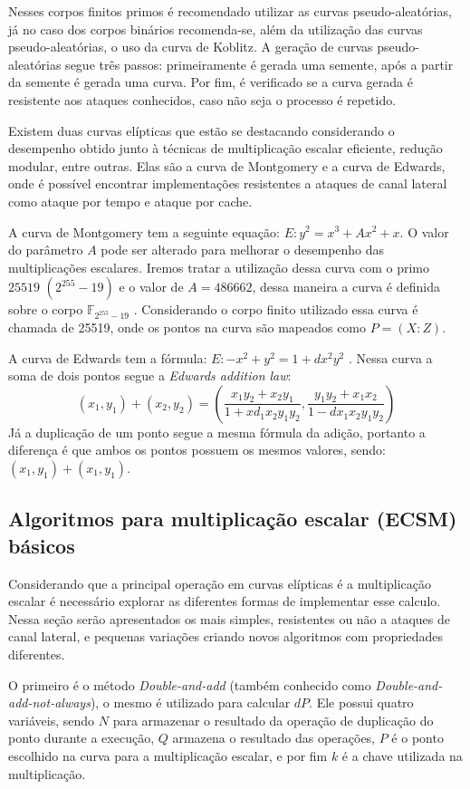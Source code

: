 Nesses corpos finitos primos é recomendado utilizar as curvas pseudo-aleatórias, já no caso dos corpos binários recomenda-se, além da utilização das curvas pseudo-aleatórias, o uso da curva de Koblitz. A geração de curvas pseudo-aleatórias segue três passos: primeiramente é gerada uma semente, após a partir da semente é gerada uma curva. Por fim, é verificado se a curva gerada é resistente aos ataques conhecidos, caso não seja o processo é repetido.

Existem duas curvas elípticas que estão se destacando considerando o desempenho obtido junto à técnicas de multiplicação escalar eficiente, redução modular, entre outras. Elas são a curva de Montgomery e a curva de Edwards, onde é possível encontrar implementações resistentes a ataques de canal lateral como ataque por tempo e ataque por cache.

A curva de Montgomery tem a seguinte equação: $E: y^2 = x^3 + Ax^2 + x$. O valor do parâmetro $A$ pode ser alterado para melhorar o desempenho das multiplicações escalares. Iremos tratar a utilização dessa curva com o primo $25519$ $(2^{255}-19)$ e o valor de $A = 486662$, dessa maneira a curva é definida sobre o corpo $\mathbb{F}_{2^{255}-19}$ \cite{Dull:2015:HCM:2834659.2834708}. Considerando o corpo finito utilizado essa curva é chamada de 25519, onde os pontos na curva são mapeados como $P = (X : Z)$. 

A curva de Edwards tem a fórmula: $E: -x^2 + y^2 = 1 + dx^2y^2$ \cite{Bernstein2012}. Nessa curva a soma de dois pontos segue a \textit{Edwards addition law}:
$$ (x_1,y_1) + (x_2,y_2) = (\frac{x_1y_2 + x_2y_1}{1 + xd_1x_2y_1y_2},\frac{y_1y_2 + x_1x_2}{1 - dx_1x_2y_1y_2}) $$
Já a duplicação de um ponto segue a mesma fórmula da adição, portanto a diferença é que ambos os pontos possuem os mesmos valores, sendo: $(x_1, y_1) + (x_1, y_1)$.

\subsection{Algoritmos para multiplicação escalar (ECSM) básicos}
Considerando que a principal operação em curvas elípticas é a multiplicação escalar é necessário explorar as diferentes formas de implementar esse calculo. Nessa seção serão apresentados os mais simples, resistentes ou não a ataques de canal lateral, e pequenas variações criando novos algoritmos com propriedades diferentes.

O primeiro é o método \textit{Double-and-add} (também conhecido como \textit{Double-and-add-not-always}), o mesmo é utilizado para calcular $dP$. Ele possui quatro variáveis, sendo $N$ para armazenar o resultado da operação de duplicação do ponto durante a execução, $Q$ armazena o resultado das operações, $P$ é o ponto escolhido na curva para a multiplicação escalar, e por fim $k$ é a chave utilizada na multiplicação.

